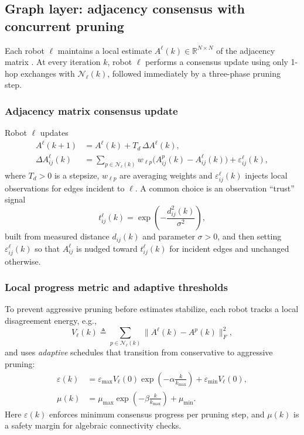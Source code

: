 \documentclass[conference]{IEEEconf}
\theoremstyle{plain}
\begin{document}
\subsection{Graph layer: adjacency consensus with concurrent pruning}
Each robot $\ell$ maintains a local estimate $A^\ell(k)\in\mathbb{R}^{N\times N}$ of the adjacency matrix \cite{venkateswaran2024}.
At every iteration $k$, robot $\ell$ performs a consensus update using only 1-hop exchanges with $\mathcal{N}_\ell(k)$, followed immediately by a three-phase pruning step.

\subsubsection{Adjacency matrix consensus update}
Robot $\ell$ updates
\begin{align}
A^\ell(k{+}1) &= A^\ell(k) + T_d\,\Delta A^\ell(k),
\label{eq:adj_consensus_1}\\
\Delta A^\ell_{ij}(k) &=
\sum_{p\in\mathcal{N}_\ell(k)} w_{\ell p}\Big(A^p_{ij}(k)-A^\ell_{ij}(k)\Big)
+ \varepsilon^\ell_{ij}(k),
\label{eq:adj_consensus_2}
\end{align}
where $T_d>0$ is a stepsize, $w_{\ell p}$ are averaging weights and $\varepsilon^\ell_{ij}(k)$ injects local observations for edges incident to $\ell$.
A common choice is an observation ``trust'' signal
\begin{equation}
t^\ell_{ij}(k)=\exp\!\left(-\frac{d_{ij}^2(k)}{\sigma^2}\right),
\label{eq:trust}
\end{equation}
built from measured distance $d_{ij}(k)$ and parameter $\sigma>0$, and then setting $\varepsilon^\ell_{ij}(k)$ so that $A^\ell_{ij}$ is nudged toward $t^\ell_{ij}(k)$ for incident edges and unchanged otherwise.

\subsubsection{Local progress metric and adaptive thresholds}
To prevent aggressive pruning before estimates stabilize, each robot tracks a local disagreement energy, e.g.,
\begin{equation}
V_\ell(k)\triangleq \sum_{p\in\mathcal{N}_\ell(k)}\big\|A^\ell(k)-A^p(k)\big\|_F^2,
\label{eq:local_lyap}
\end{equation}
and uses \emph{adaptive} schedules that transition from conservative to aggressive pruning:
\begin{align}
\varepsilon(k) &= \varepsilon_{\max} V_\ell(0)\exp\!\left(-\alpha \frac{k}{k_{\max}}\right)
+ \varepsilon_{\min} V_\ell(0),
\label{eq:eps_sched}\\
\mu(k) &= \mu_{\max}\exp\!\left(-\beta \frac{k}{k_{\max}}\right)+\mu_{\min}.
\label{eq:mu_sched}
\end{align}
Here $\varepsilon(k)$ enforces minimum consensus progress per pruning step, and $\mu(k)$ is a safety margin for algebraic connectivity checks.
\end{document}
